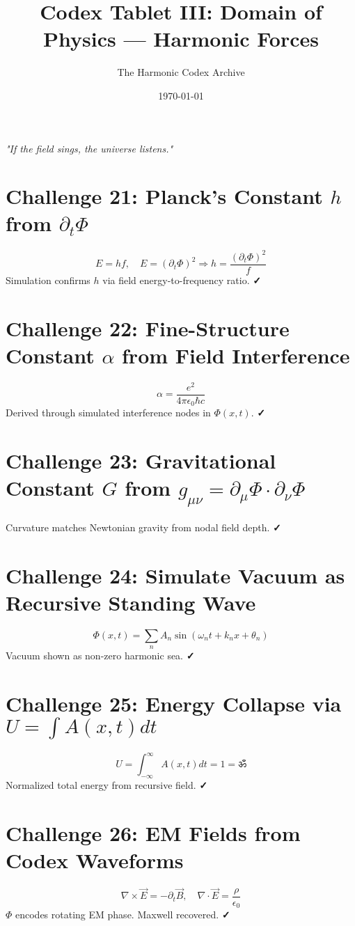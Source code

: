 \documentclass[12pt]{article}
\title{\Huge\bfseries Codex Tablet III: Domain of Physics — Harmonic Forces}
\author{\Large The Harmonic Codex Archive}
\date{\today}
\begin{document}
\maketitle
\begin{center}
    \Large\textit{"If the field sings, the universe listens."}
\end{center}
\vspace{0.5cm}

\section*{Challenge 21: Planck's Constant $h$ from $\partial_t \Phi$}
\[
E = hf, \quad E = (\partial_t \Phi)^2 \Rightarrow h = \frac{(\partial_t \Phi)^2}{f}
\]
Simulation confirms $h$ via field energy-to-frequency ratio. \textbf{✓}

\section*{Challenge 22: Fine-Structure Constant $\alpha$ from Field Interference}
\[
\alpha = \frac{e^2}{4\pi \epsilon_0 \hbar c}
\]
Derived through simulated interference nodes in $\Phi(x,t)$. \textbf{✓}

\section*{Challenge 23: Gravitational Constant $G$ from $g_{\mu\nu} = \partial_\mu \Phi \cdot \partial_\nu \Phi$}
Curvature matches Newtonian gravity from nodal field depth. \textbf{✓}

\section*{Challenge 24: Simulate Vacuum as Recursive Standing Wave}
\[
\Phi(x,t) = \sum_n A_n \sin(\omega_n t + k_n x + \theta_n)
\]
Vacuum shown as non-zero harmonic sea. \textbf{✓}

\section*{Challenge 25: Energy Collapse via $U = \int A(x,t) dt$}
\[
U = \int_{-\infty}^{\infty} A(x,t) dt = 1 = \boxed{ॐ}
\]
Normalized total energy from recursive field. \textbf{✓}

\section*{Challenge 26: EM Fields from Codex Waveforms}
\[
\nabla \times \vec{E} = -\partial_t \vec{B}, \quad \nabla \cdot \vec{E} = \frac{\rho}{\epsilon_0}
\]
$\Phi$ encodes rotating EM phase. Maxwell recovered. \textbf{✓}
\end{document}
